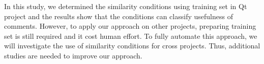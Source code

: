 In this study, we determined the similarity conditions using training set in Qt project and the results show that the conditions can classify usefulness of comments. However, to apply our approach on other projects, preparing training set is still required and it cost human effort. To fully automate this approach, we will investigate the use of similarity conditions for cross projects. Thus, additional studies are needed to improve our approach. 


